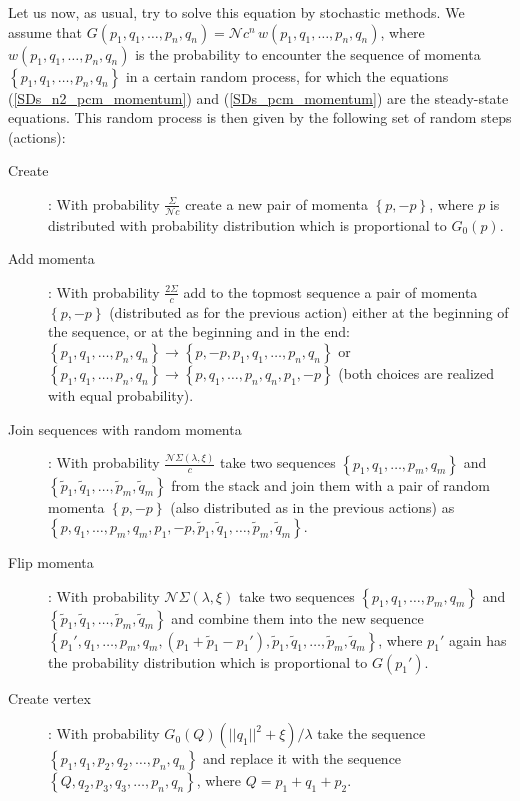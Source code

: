 \documentclass[twocolumn,showpacs,preprintnumbers,superscriptaddress,amsmath,floatfix,amssymb,secnumarabic]{revtex4}
\newcommand{\lr}[1]{ \left( #1 \right) }
\newcommand{\lrc}[1]{ \left\{ #1 \right\} }
\begin{document}
Let us now, as usual, try to solve this equation by stochastic methods. We assume that $G\lr{p_1, q_1, \ldots, p_n, q_n} = \mathcal{N} c^{n} \, w\lr{p_1, q_1, \ldots, p_n, q_n}$, where $w\lr{p_1, q_1, \ldots, p_n, q_n}$ is the probability to encounter the sequence of momenta $\lrc{p_1, q_1, \ldots, p_n, q_n}$ in a certain random process, for which the equations (\ref{SDs_n2_pcm_momentum}) and (\ref{SDs_pcm_momentum}) are the steady-state equations. This random process is then given by the following set of random steps (actions):

\begin{description}
 \item[Create]: With probability $\frac{\Sigma}{\mathcal{N} c}$ create a new pair of momenta $\lrc{p, -p}$, where $p$ is distributed with probability distribution which is proportional to $G_0\lr{p}$.
 \item[Add momenta]: With probability $\frac{2 \Sigma}{c}$ add to the topmost sequence a pair of momenta $\lrc{p, -p}$ (distributed as for the previous action) either at the beginning of the sequence, or at the beginning and in the end: $\lrc{p_1, q_1, \ldots, p_n, q_n} \rightarrow \lrc{p, -p, p_1, q_1, \ldots, p_n, q_n}$ or $\lrc{p_1, q_1, \ldots, p_n, q_n} \rightarrow \lrc{p, q_1, \ldots, p_n, q_n, p_1, -p}$ (both choices are realized with equal probability).
 \item[Join sequences with random momenta]: With probability $\frac{\mathcal{N} \Sigma\lr{\lambda, \xi}}{c}$ take two sequences $\lrc{p_1, q_1, \ldots, p_m, q_m}$ and $\lrc{\tilde{p}_1, \tilde{q}_1, \ldots, \tilde{p}_m, \tilde{q}_m}$ from the stack and join them with a pair of random momenta $\lrc{p, -p}$ (also distributed as in the previous actions) as $\lrc{p, q_1, \ldots, p_m, q_m, p_1, -p, \tilde{p}_1, \tilde{q}_1, \ldots, \tilde{p}_m, \tilde{q}_m}$.
 \item[Flip momenta]: With probability $\mathcal{N} \Sigma\lr{\lambda, \xi}$ take two sequences $\lrc{p_1, q_1, \ldots, p_m, q_m}$ and $\lrc{\tilde{p}_1, \tilde{q}_1, \ldots, \tilde{p}_m, \tilde{q}_m}$ and combine them into the new sequence $\lrc{p_1', q_1, \ldots, p_m, q_m, \lr{p_1 + \tilde{p}_1 - p_1'}, \tilde{p}_1, \tilde{q}_1, \ldots, \tilde{p}_m, \tilde{q}_m}$, where $p_1'$ again has the probability distribution which is proportional to $G\lr{p_1'}$.
 \item[Create vertex]: With probability $G_0\lr{Q} \lr{||q_1||^2 + \xi}/\lambda$ take the sequence $\lrc{p_1, q_1, p_2, q_2, \ldots, p_n, q_n}$ and replace it with the sequence $\lrc{Q, q_2, p_3, q_3, \ldots, p_n, q_n}$, where $Q = p_1 + q_1 + p_2$.
\end{description}
\end{document}
